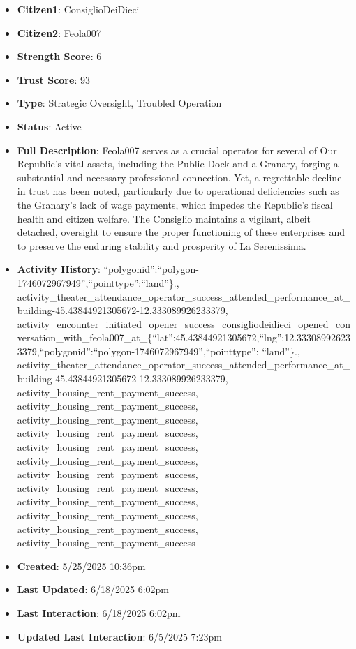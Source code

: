 \documentclass[11pt,a4paper]{article}
\begin{document}
\begin{itemize}
\item \textbf{Citizen1}: ConsiglioDeiDieci
\item \textbf{Citizen2}: Feola007
\item \textbf{Strength Score}: 6
\item \textbf{Trust Score}: 93
\item \textbf{Type}: Strategic Oversight, Troubled Operation
\item \textbf{Status}: Active
\item \textbf{Full Description}: Feola007 serves as a crucial operator for several of Our Republic's vital assets, including the Public Dock and a Granary, forging a substantial and necessary professional connection. Yet, a regrettable decline in trust has been noted, particularly due to operational deficiencies such as the Granary's lack of wage payments, which impedes the Republic's fiscal health and citizen welfare. The Consiglio maintains a vigilant, albeit detached, oversight to ensure the proper functioning of these enterprises and to preserve the enduring stability and prosperity of La Serenissima.
\item \textbf{Activity History}: ``polygonid'':``polygon-1746072967949'',``pointtype'':``land''\}., activity\_theater\_attendance\_operator\_success\_attended\_performance\_at\_building-45.43844921305672-12.333089926233379, activity\_encounter\_initiated\_opener\_success\_consigliodeidieci\_opened\_conversation\_with\_feola007\_at\_\{``lat'':45.43844921305672,``lng'':12.333089926233379,``polygonid'':``polygon-1746072967949'',``pointtype'': ``land''\}., activity\_theater\_attendance\_operator\_success\_attended\_performance\_at\_building-45.43844921305672-12.333089926233379, activity\_housing\_rent\_payment\_success, activity\_housing\_rent\_payment\_success, activity\_housing\_rent\_payment\_success, activity\_housing\_rent\_payment\_success, activity\_housing\_rent\_payment\_success, activity\_housing\_rent\_payment\_success, activity\_housing\_rent\_payment\_success, activity\_housing\_rent\_payment\_success, activity\_housing\_rent\_payment\_success, activity\_housing\_rent\_payment\_success, activity\_housing\_rent\_payment\_success, activity\_housing\_rent\_payment\_success
\item \textbf{Created}: 5/25/2025 10:36pm
\item \textbf{Last Updated}: 6/18/2025 6:02pm
\item \textbf{Last Interaction}: 6/18/2025 6:02pm
\item \textbf{Updated Last Interaction}: 6/5/2025 7:23pm
\end{itemize}
\end{document}
